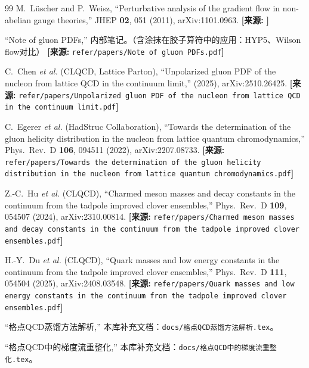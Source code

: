 \documentclass[12pt,a4paper]{ctexart}
\theoremstyle{definition}
\begin{document}
\begin{thebibliography}{99}
M.~L\"uscher and P.~Weisz,
``Perturbative analysis of the gradient flow in non-abelian gauge theories,''
JHEP \textbf{02}, 051 (2011), arXiv:1101.0963.
\quad\textbf{[来源:} \texttt{}\textbf{]}


``Note of gluon PDFs,''
内部笔记。（含涂抹在胶子算符中的应用：HYP5、Wilson flow对比）
\quad\textbf{[来源:} \texttt{refer/papers/Note of gluon PDFs.pdf}\textbf{]}

C.~Chen \textit{et al.} (CLQCD, Lattice Parton),
``Unpolarized gluon PDF of the nucleon from lattice QCD in the continuum limit,''
(2025), arXiv:2510.26425.
\quad\textbf{[来源:} \texttt{refer/papers/Unpolarized gluon PDF of the nucleon from lattice QCD in the continuum limit.pdf}\textbf{]}

C.~Egerer \textit{et al.} (HadStruc Collaboration),
``Towards the determination of the gluon helicity distribution in the nucleon from lattice quantum chromodynamics,''
Phys.\ Rev.\ D \textbf{106}, 094511 (2022), arXiv:2207.08733.
\quad\textbf{[来源:} \texttt{refer/papers/Towards the determination of the gluon helicity distribution in the nucleon from lattice quantum chromodynamics.pdf}\textbf{]}

Z.-C.~Hu \textit{et al.} (CLQCD),
``Charmed meson masses and decay constants in the continuum from the tadpole improved clover ensembles,''
Phys.\ Rev.\ D \textbf{109}, 054507 (2024), arXiv:2310.00814.
\quad\textbf{[来源:} \texttt{refer/papers/Charmed meson masses and decay constants in the continuum from the tadpole improved clover ensembles.pdf}\textbf{]}

H.-Y.~Du \textit{et al.} (CLQCD),
``Quark masses and low energy constants in the continuum from the tadpole improved clover ensembles,''
Phys.\ Rev.\ D \textbf{111}, 054504 (2025), arXiv:2408.03548.
\quad\textbf{[来源:} \texttt{refer/papers/Quark masses and low energy constants in the continuum from the tadpole improved clover ensembles.pdf}\textbf{]}


``格点QCD蒸馏方法解析,''
本库补充文档：\texttt{docs/格点QCD蒸馏方法解析.tex}。

``格点QCD中的梯度流重整化,''
本库补充文档：\texttt{docs/格点QCD中的梯度流重整化.tex}。

\end{thebibliography}
\end{document}
